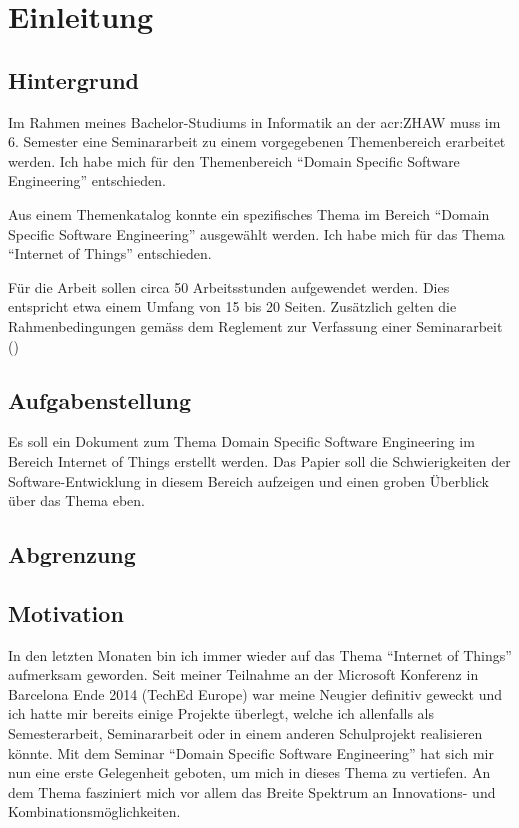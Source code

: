 
\chapter{Einleitung}

\section{Hintergrund}
Im Rahmen meines Bachelor-Studiums in Informatik an der \gls{acr:ZHAW} muss im 6. Semester eine Seminararbeit zu einem vorgegebenen Themenbereich erarbeitet werden. Ich habe mich für den Themenbereich "`Domain Specific Software Engineering"' entschieden.

Aus einem Themenkatalog konnte ein spezifisches Thema im Bereich "`Domain Specific Software Engineering"' ausgewählt werden. Ich habe mich für das Thema "`Internet of Things"' entschieden.

Für die Arbeit sollen circa 50 Arbeitsstunden aufgewendet werden. Dies entspricht etwa einem Umfang von 15 bis 20 Seiten. Zusätzlich gelten die Rahmenbedingungen gemäss dem Reglement zur Verfassung einer Seminararbeit (\cite{ZHAW:2012:Seminararbeit:Reglemente})

\section{Aufgabenstellung}
Es soll ein Dokument zum Thema Domain Specific Software Engineering im Bereich Internet of Things erstellt werden. Das Papier soll die Schwierigkeiten der Software-Entwicklung in diesem Bereich aufzeigen und einen groben Überblick über das Thema eben.

\section{Abgrenzung}

\section{Motivation}
In den letzten Monaten bin ich immer wieder auf das Thema "`Internet of Things"' aufmerksam geworden. Seit meiner Teilnahme an der Microsoft Konferenz in Barcelona Ende 2014 (TechEd Europe) war meine Neugier definitiv geweckt und ich hatte mir bereits einige Projekte überlegt, welche ich allenfalls als Semesterarbeit, Seminararbeit oder in einem anderen Schulprojekt realisieren könnte. Mit dem Seminar "`Domain Specific Software Engineering"' hat sich mir nun eine erste Gelegenheit geboten, um mich in dieses Thema zu vertiefen. An dem Thema fasziniert mich vor allem das Breite Spektrum an Innovations- und Kombinationsmöglichkeiten.


